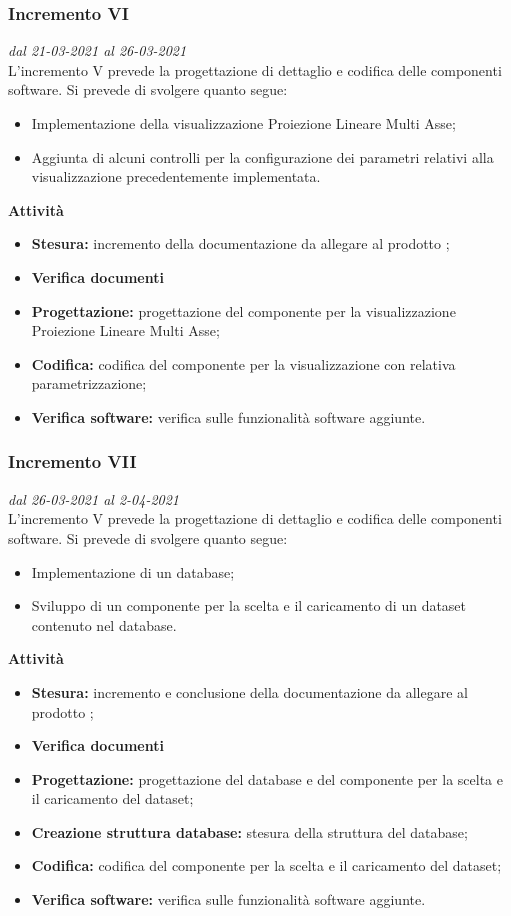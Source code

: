 \subsubsection{Incremento VI}
\textit{dal 21-03-2021 al 26-03-2021}\\
L'incremento V prevede la progettazione di dettaglio e codifica delle componenti software. Si prevede di svolgere quanto segue:
\begin{itemize}
\item Implementazione della visualizzazione Proiezione Lineare Multi Asse;
\item Aggiunta di alcuni controlli per la configurazione dei parametri relativi alla visualizzazione precedentemente implementata.
\end{itemize}
\textbf{Attività}
\begin{itemize}
\item \textbf{Stesura:} incremento della documentazione da allegare al prodotto ;
\item \textbf{Verifica documenti}
\item \textbf{Progettazione:} progettazione del componente per la visualizzazione Proiezione Lineare Multi Asse;
\item \textbf{Codifica:} codifica del componente per la visualizzazione con relativa parametrizzazione;
\item \textbf{Verifica software:} verifica sulle funzionalità software aggiunte.
\end{itemize}

\subsubsection{Incremento VII}
\textit{dal 26-03-2021 al 2-04-2021}\\
L'incremento V prevede la progettazione di dettaglio e codifica delle componenti software. Si prevede di svolgere quanto segue:
\begin{itemize}
\item Implementazione di un database;
\item Sviluppo di un componente per la scelta e il caricamento di un dataset contenuto nel database.
\end{itemize}
\textbf{Attività}
\begin{itemize}
\item \textbf{Stesura:} incremento e conclusione della documentazione da allegare al prodotto ;
\item \textbf{Verifica documenti}
\item \textbf{Progettazione:} progettazione del database e del componente per la scelta e il caricamento del dataset;
\item \textbf{Creazione struttura database:} stesura della struttura del database;
\item \textbf{Codifica:} codifica del componente per la scelta e il caricamento del dataset;
\item \textbf{Verifica software:} verifica sulle funzionalità software aggiunte.
\end{itemize}

